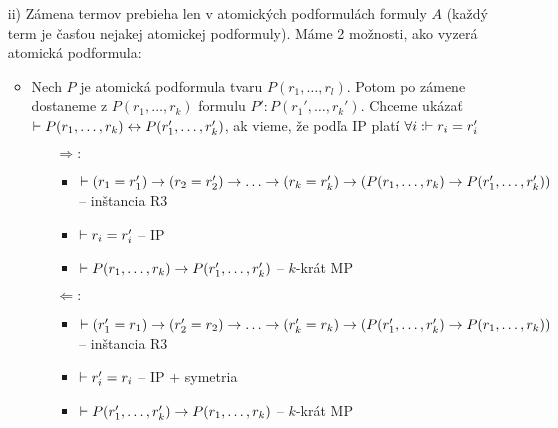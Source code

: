 \begin{dokaz}
\begin{itemize}
\begin{itemize}
        \end{itemize}
    \item[ii)] Zámena termov prebieha len v atomických podformulách
        formuly $A$ (každý term je časťou nejakej atomickej podformuly).
        Máme 2 možnosti, ako vyzerá atomická podformula:
        \begin{itemize}
        \item Nech $P$ je atomická podformula tvaru
            $P(r_1,\dots,r_l)$. Potom po zámene dostaneme z 
            $P(r_1, \dots, r_k)$ formulu $P':P(r_1',\dots,r_k')$.
            Chceme ukázať $\vdash P(r_1,\dots,r_k) \leftrightarrow
                                     P(r_1',\dots,r_k')$, ak vieme, že
            podľa IP platí $\forall i: \vdash r_i = r_i'$
            \begin{itemize}
            \item [$\Rightarrow:$] 
                \begin{itemize}
                \item $\provable (r_1=r_1') \implies
                                 (r_2=r_2') \implies \dots \implies
                                 (r_k=r_k') \implies
                                 (P(r_1,\dots,r_k) \implies
                                 P(r_1',\dots,r_k'))$ -- inštancia R3
                \item $\vdash r_i = r_i'$ -- IP
                \item $\vdash P(r_1,\dots,r_k) \rightarrow
                    P(r_1',\dots, r_k')$ -- $k$-krát MP
                \end{itemize}
            \item [$\Leftarrow:$]
                \begin{itemize}
                \item $\provable (r_1'=r_1) \implies
                                 (r_2'=r_2) \implies \dots \implies
                                 (r_k'=r_k) \implies
                                 (P(r_1',\dots,r_k') \implies
                                 P(r_1,\dots,r_k))$ -- inštancia R3
                \item $\vdash r_i' = r_i$ -- IP + symetria
                \item $\vdash P(r_1',\dots,r_k') \rightarrow
                    P(r_1,\dots, r_k)$ -- $k$-krát MP
                

\end{itemize}
\end{itemize}
\end{itemize}
\end{itemize}
\end{dokaz}
